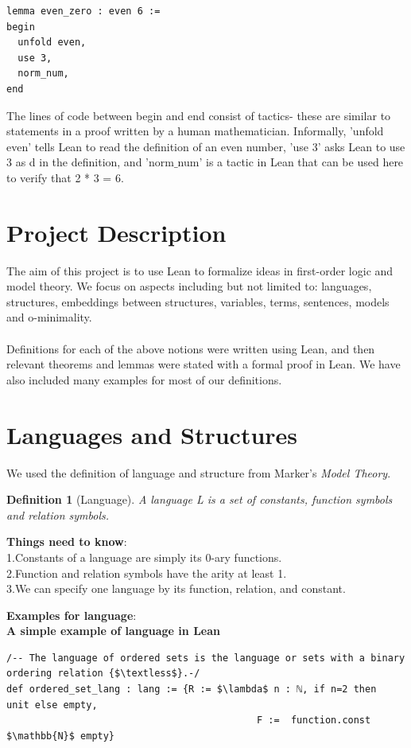 \documentclass[landscape]{sciposter}
\newtheorem*{definition}{Definition}
\begin{document}
\begin{multicols}{4}
\begin{lstlisting}
lemma even_zero : even 6 :=
begin
  unfold even,
  use 3,
  norm_num,
end
\end{lstlisting}

The lines of code between begin and end consist of tactics- these are similar to statements in a proof written by a human mathematician. Informally, 'unfold even' tells Lean to read the definition of an even number, 'use 3' asks Lean to use 3 as d in the definition, and 'norm$\_$num' is a tactic in Lean that can be used here to verify that 2 * 3 = 6.



\section*{Project Description}
The aim of this project is to use Lean to formalize ideas in first-order logic and model theory. We focus on aspects including but not limited to: languages, structures, embeddings between structures,
variables, terms, sentences, models and o-minimality.\\ \\Definitions for each of the above notions were written using Lean, and then relevant theorems and lemmas were stated with a formal proof in Lean. We have also included many examples for most of our definitions.

\section*{Languages and Structures}

We used the definition of language and structure from Marker's \textit{Model Theory}.

\begin{definition}[Language]

A language L is a set of constants, function symbols and relation symbols.

\end{definition}

\textbf {Things need to know}: \\
1.Constants of a language are simply its 0-ary functions. \\
2.Function and relation symbols have the arity at least 1. \\
3.We can specify one language by its function, relation, and constant.

\textbf{Examples for language}: \\
\textbf{A simple example of language in Lean}
\begin{lstlisting}
/-- The language of ordered sets is the language or sets with a binary ordering relation {$\textless$}.-/
def ordered_set_lang : lang := {R := $\lambda$ n : ℕ, if n=2 then                                                        unit else empty,
                                            F :=  function.const $\mathbb{N}$ empty}
\end{lstlisting}


\end{multicols}
\end{document}
